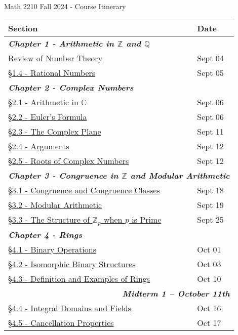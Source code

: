 \documentclass{article}
\newcommand{\chaptercolor}{RoyalBlue!35}
\newcommand{\testcolor}{Bittersweet!25}
\begin{document}
\large
\begin{center}
{\Huge Math 2210 Fall 2024 - Course Itinerary}
\vspace{0.25cm}

\begin{tabular}{|l|l|}
\cellcolor{black!85}\color{white}Section & \cellcolor{black!85}\color{white}Date\\
%
\hline
%
\multicolumn{2}{|l|}{\cellcolor{\chaptercolor} \textit{\textbf{Chapter 1 - Arithmetic in $\mathbb{Z}$ and $\mathbb{Q}$}}}\\
\hline
\href{}{Review of Number Theory\phantom{--------------------------------------------------------}} & Sept 04\\
\href{}{\S1.4 - Rational Numbers} & Sept 05\\
\hline
\multicolumn{2}{|l|}{\cellcolor{\chaptercolor} \textit{\textbf{Chapter 2 - Complex Numbers}}}\\
\hline
\href{}{\S2.1 - Arithmetic in $\mathbb{C}$} & Sept 06\\
\href{}{\S2.2 - Euler's Formula} & Sept 06\\
\href{}{\S2.3 - The Complex Plane} & Sept 11\\
\href{}{\S2.4 - Arguments} & Sept 12\\
\href{}{\S2.5 - Roots of Complex Numbers} & Sept 12\\
\hline
\multicolumn{2}{|l|}{\cellcolor{\chaptercolor} \textit{\textbf{Chapter 3 - Congruence in $\mathbb{Z}$ and Modular Arithmetic}}}\\
\hline
\href{}{\S3.1 - Congruence and Congruence Classes} & Sept 18\\
\href{}{\S3.2 - Modular Arithmetic} & Sept 19\\
\href{}{\S3.3 - The Structure of $\mathbb{Z}_{p}$ when $p$ is Prime} & Sept 25\\
\hline
\multicolumn{2}{|l|}{\cellcolor{\chaptercolor} \textit{\textbf{Chapter 4 - Rings}}}\\
\hline
\href{}{\S4.1 - Binary Operations} & Oct 01\\
\href{}{\S4.2 - Isomorphic Binary Structures} & Oct 03\\
\href{}{\S4.3 - Definition and Examples of Rings} & Oct 10\\
\hline
\multicolumn{2}{|r|}{\cellcolor{\testcolor} \textit{\textbf{Midterm 1 -- October 11th}}}\\
\hline
\href{}{\S4.4 - Integral Domains and Fields} & Oct 16\\
\href{}{\S4.5 - Cancellation Properties} & Oct 17\\

\end{tabular}
\end{center}
\end{document}
